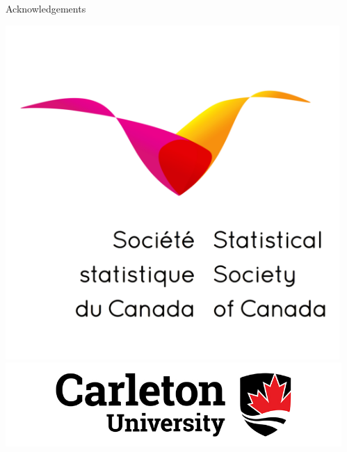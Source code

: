 \documentclass[final]{beamer}
\newlength{\sepwid}
\newlength{\onecolwid}
\begin{document}
\begin{frame}[t]
\begin{columns}[t]
\begin{column}{\onecolwid}
\begin{block}{Acknowledgements}
    	        \begin{center}
    			   \includegraphics[width=5in]{SSC.png}
    	           \includegraphics[width=7in]{carleton.jpg}
    			 \end{center}
    		  \end{block}
        \end{column}
      \begin{column}{\sepwid}\end{column}			%
     \end{columns}
\end{frame}
\end{document}
